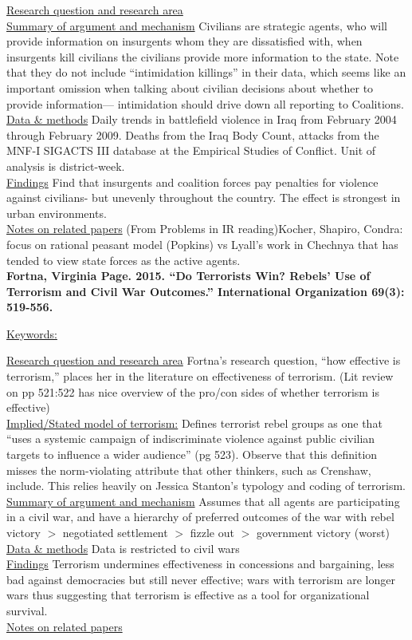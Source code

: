 \documentclass{article}[12pt]
\begin{document}
\underline{Research question and research area}\\
\underline{Summary of argument and mechanism} Civilians are strategic agents, who will provide information on insurgents whom they are dissatisfied with, when insurgents kill civilians the civilians provide more information to the state. Note that they do not include ``intimidation killings'' in their data, which seems like an important omission when talking about civilian decisions about whether to provide information--- intimidation should drive down all reporting to Coalitions.  \\
\underline{Data \& methods} Daily trends in battlefield violence in Iraq from February 2004 through February 2009. Deaths from the Iraq Body Count, attacks from the MNF-I SIGACTS III database at the Empirical Studies of Conflict. Unit of analysis is district-week. \\
\underline{Findings} Find that insurgents and coalition forces pay penalties for violence against civilians- but unevenly throughout the country. The effect is strongest in urban environments.\\
\underline{Notes on related papers} (From Problems in IR reading)Kocher, Shapiro, Condra: focus on rational peasant model (Popkins) vs Lyall's work in Chechnya that has tended to view state forces as the active agents.\\


\textbf{Fortna, Virginia Page. 2015. “Do Terrorists Win? Rebels’ Use of Terrorism and Civil War
Outcomes.” International Organization 69(3): 519-556.}

\underline{Keywords:}

\underline{Research question and research area} Fortna's research question, ``how effective is terrorism,'' places her in the literature on effectiveness of terrorism. (Lit review on pp 521:522 has nice overview of the pro/con sides of whether terrorism is effective)\\
\underline{Implied/Stated model of terrorism:} Defines terrorist rebel groups as one that ``uses a systemic campaign of indiscriminate violence against public civilian targets to influence a wider audience'' (pg 523). Observe that this definition misses the norm-violating attribute that other thinkers, such as Crenshaw, include. This relies heavily on Jessica Stanton's typology and coding of terrorism.\\
\underline{Summary of argument and mechanism} Assumes that all agents are participating in a civil war, and have a hierarchy of preferred outcomes of the war with rebel victory $>$ negotiated settlement $>$ fizzle out $>$ government victory (worst)  \\
\underline{Data \& methods} Data is restricted to civil wars\\
\underline{Findings} Terrorism undermines effectiveness in concessions and bargaining, less bad against democracies but still never effective; wars with terrorism are longer wars thus suggesting that terrorism is effective as a tool for organizational survival.\\
\underline{Notes on related papers}\\
\end{document}
